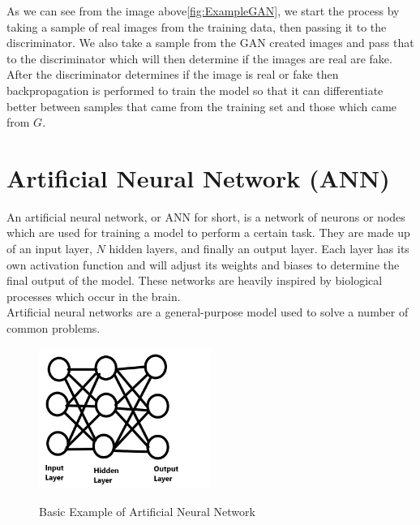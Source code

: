 \vspace{0.5mm}
As we can see from the image above\ref{fig:ExampleGAN}, we start the process by taking a sample of real images from the training data, then passing it to the discriminator. We also take a sample from the GAN created images and pass that to the discriminator which will then determine if the images are real are fake.  After the discriminator determines if the image is real or fake then backpropagation is performed to train the model so that it can differentiate better between samples that came from the training set and those which came from $G$.
\section{Artificial Neural Network (ANN)}
An artificial neural network, or ANN for short, is a network of neurons or nodes which are used for training a model to perform a certain task.  They are made up of an input layer, $N$ hidden layers, and finally an output layer.  Each layer has its own activation function and will adjust its weights and biases to determine the final output of the model.\cite{introToCnn} These networks are  heavily inspired by biological processes which occur in the brain.
\\
Artificial neural networks are a general-purpose model used to solve a number of common problems.
\vspace{0.5mm}
\begin{figure}[H]
    \centering
    \includegraphics[width=0.5\textwidth]{Images/ANN Basic.jpg}\\
    \caption{Basic Example of Artificial Neural Network}
    \label{fig:ExampleANN}
\end{figure}
\vspace{0.5mm}

